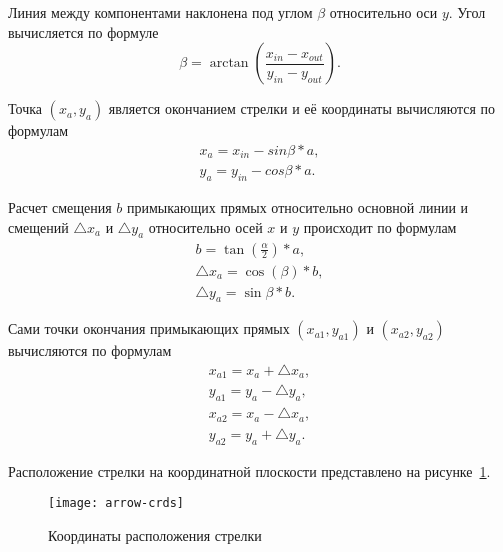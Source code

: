 {Линия между компонентами наклонена под углом $ \beta $ относительно оси $ y $. Угол
вычисляется по формуле
\begin{equation}
	\beta = \arctan(\frac{x_{in} - x_{out}}{y_{in} - y_{out}}).
\end{equation}

Точка
$ (x_a, y_a) $ является окончанием стрелки и её координаты вычисляются по формулам
\begin{gather}
	x_a = x_{in} - sin \beta * a, \\
	y_a = y_{in} - cos \beta * a.
\end{gather}


Расчет смещения $b$ примыкающих прямых относительно основной линии и
смещений $\bigtriangleup x_a$
и $\bigtriangleup y_a$ относительно осей $x$ и $y$ происходит по формулам
\begin{gather}
	b = \tan(\frac{\alpha}{2})*a, \\
	\bigtriangleup x_a = \cos(\beta) * b, \\
	\bigtriangleup y_a = \sin{\beta} * b.
\end{gather}


Сами точки окончания примыкающих прямых
$ (x_{a1}, y_{a1}) $ и $ (x_{a2}, y_{a2}) $
вычисляются по формулам
\begin{gather}
	x_{a1} = x_a + \bigtriangleup x_a, \\
	y_{a1} = y_a - \bigtriangleup y_a, \\
	x_{a2} = x_a - \bigtriangleup x_a, \\
	y_{a2} = y_a + \bigtriangleup y_a.
\end{gather}

Расположение стрелки на координатной плоскости представлено
на рисунке~\ref{f:arrow-crds}.

\begin{figure}[ht]
	\centering
	\texttt{[image: arrow-crds]}
	\caption{Координаты расположения стрелки}
	\label{f:arrow-crds}
\end{figure}


}

